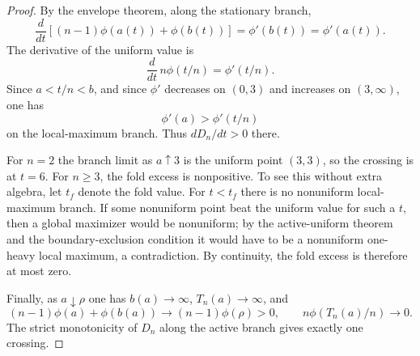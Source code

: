 \documentclass[11pt]{article}
\theoremstyle{definition}
\begin{document}
\begin{proof}
By the envelope theorem, along the stationary branch,
\[
  \frac{d}{dt}\left[(n-1)\phi(a(t))+\phi(b(t))\right]=\phi'(b(t))=\phi'(a(t)).
\]
The derivative of the uniform value is
\[
  \frac{d}{dt}\,n\phi(t/n)=\phi'(t/n).
\]
Since $a<t/n<b$, and since $\phi'$ decreases on $(0,3)$ and increases on $(3,\infty)$, one has
\[
  \phi'(a)>\phi'(t/n)
\]
on the local-maximum branch.  Thus $dD_n/dt>0$ there.

For $n=2$ the branch limit as $a\uparrow3$ is the uniform point
$(3,3)$, so the crossing is at $t=6$.  For $n\ge3$, the fold excess is nonpositive.  To see this without extra algebra, let $t_f$ denote the fold value.  For $t<t_f$ there is no nonuniform local-maximum branch.  If some nonuniform point beat the uniform value for such a $t$, then a global maximizer would be nonuniform; by the active-uniform theorem and the boundary-exclusion condition it would have to be a nonuniform one-heavy local maximum, a contradiction.  By continuity, the fold excess is therefore at most zero.

Finally, as $a\downarrow\rho$ one has $b(a)\to\infty$, $T_n(a)\to\infty$, and
\[
  (n-1)\phi(a)+\phi(b(a))\to(n-1)\phi(\rho)>0,
  \qquad
  n\phi(T_n(a)/n)\to0.
\]
The strict monotonicity of $D_n$ along the active branch gives exactly one crossing.
\end{proof}
\end{document}
